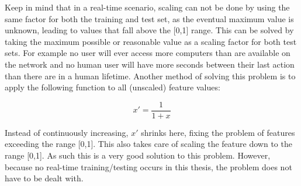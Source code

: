 Keep in mind that in a real-time scenario, scaling can not be done by using the same factor for both the training and test set, as the eventual maximum value is unknown, leading to values that fall above the [0,1] range. This can be solved by taking the maximum possible or reasonable value as a scaling factor for both test sets. For example no user will ever access more computers than are available on the network and no human user will have more seconds between their last action than there are in a human lifetime. Another method of solving this problem is to apply the following function to all (unscaled) feature values:

\begin{equation} \label{eq:normalize_2}
x' = \dfrac{1}{1+x}
\end{equation}

Instead of continuously increasing, \(x'\) shrinks here, fixing the problem of features exceeding the range [0,1]. This also takes care of scaling the feature down to the range [0,1]. As such this is a very good solution to this problem. However, because no real-time training/testing occurs in this thesis, the problem does not have to be dealt with.












